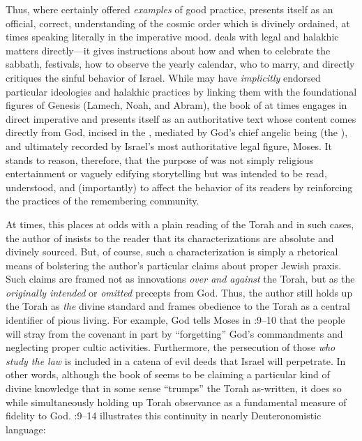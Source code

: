 Thus, where \ga certainly offered \emph{examples} of good practice, \jub presents itself as an official, correct, understanding of the cosmic order which is divinely ordained, at times speaking literally in the imperative mood. \jub deals with legal and halakhic matters directly---it gives instructions about how and when to celebrate the sabbath, festivals, how to observe the yearly calendar, who to marry, and directly critiques the sinful behavior of Israel. While \ga may have \emph{implicitly} endorsed particular ideologies and halakhic practices by linking them with the foundational figures of Genesis (Lamech, Noah, and Abram), the book of \jub at times engages in direct imperative and presents itself as an authoritative text whose content comes directly from God, incised in the \heavenlytablets, mediated by God's chief angelic being (the \ap), and ultimately recorded by Israel's most authoritative legal figure, Moses. It stands to reason, therefore, that the purpose of \jub was not simply religious entertainment or vaguely edifying storytelling but was intended to be read, understood, and (importantly) to affect the behavior of its readers by reinforcing the practices of the remembering community.

At times, this places \jub at odds with a plain reading of the Torah and in such cases, the author of \jub insists to the reader that its characterizations are absolute and divinely sourced. But, of course, such a characterization is simply a rhetorical means of bolstering the author's particular claims about proper Jewish praxis. Such claims are framed not as innovations \emph{over and against} the Torah, but as the \emph{originally intended} or \emph{omitted} precepts from God. %
Thus, the author still holds up the Torah as \emph{the} divine standard and frames obedience to the Torah as a central identifier of pious living. For example, God tells Moses in :9--10 that the people will stray from the covenant in part by ``forgetting'' God's commandments and neglecting proper cultic activities. Furthermore, the persecution of those \emph{who study the law} is included in a catena of evil deeds that Israel will perpetrate. In other words, although the book of \jub seems to be claiming a particular kind of divine knowledge that in some sense ``trumps'' the Torah as-written, it does so while simultaneously holding up Torah observance as a fundamental measure of fidelity to God. :9--14 illustrates this continuity in nearly Deuteronomistic language:

